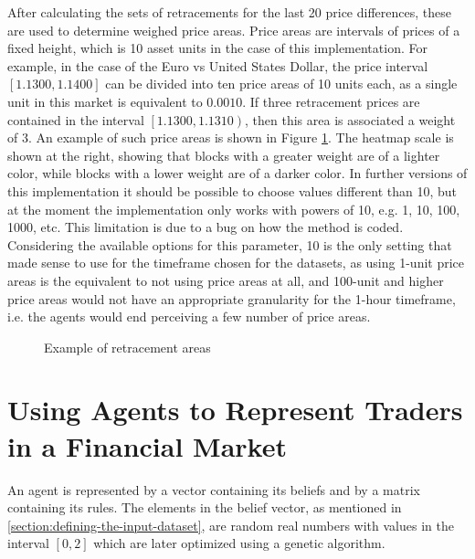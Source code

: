 After calculating the sets of retracements for the last 20 price differences,
these are used to determine weighed price areas. Price areas are intervals of
prices of a fixed height, which is 10 asset units in the case of this
implementation. For example, in the case of the Euro vs United States Dollar,
the price interval $[1.1300, 1.1400]$ can be divided into ten price areas of 10
units each, as a single unit in this market is equivalent to $0.0010$. If three
retracement prices are contained in the interval $\left[1.1300, 1.1310\right)$, then
  this area is associated a weight of $3$. An example of such price areas is
  shown in Figure \ref{figure:example-of-retracement-areas}. The heatmap scale
  is shown at the right, showing that blocks with a greater weight are of a
  lighter color, while blocks with a lower weight are of a darker color. In
  further versions of this implementation it should be possible to choose values
  different than 10, but at the moment the implementation only works with powers
  of 10, e.g. 1, 10, 100, 1000, etc. This limitation is due to a bug on how the
  method is coded. Considering the available options for this parameter, 10 is
  the only setting that made sense to use for the timeframe chosen for the
  datasets, as using 1-unit price areas is the equivalent to not using price
  areas at all, and 100-unit and higher price areas would not have an
  appropriate granularity for the 1-hour timeframe, i.e. the agents would end
  perceiving a few number of price areas.

\begin{figure}
\centering
\caption{Example of retracement areas}
\label{figure:example-of-retracement-areas}
\end{figure}

\section{Using Agents to Represent Traders in a Financial Market}
\label{section:using-agents-to-represent-traders-in-a-financial-market:implementation}

An agent is represented by a vector containing its beliefs and by a matrix
containing its rules. The elements in the belief vector, as mentioned in
\ref{section:defining-the-input-dataset}, are random real numbers with values in
the interval $[0, 2]$ which are later optimized using a genetic algorithm.

